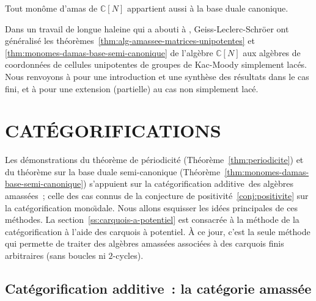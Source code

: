 \documentclass[brochure,12pt]{bourbaki}
\newcommand{\og}{\guillemotleft\hspace*{1pt}}
\newcommand{\fg}{\hspace*{1pt}\guillemotright}
\numberwithin{equation}{subsection}
\numberwithin{theorem}{section}
\newcommand{\C}{\mathbb{C}}
\begin{document}
\begin{conj}
  Tout mon\^ome d'amas de $\C[N]$ appartient aussi \`a la base duale
  canonique.
\end{conj}


Dans un travail de longue haleine qui a abouti \`a
\cite{GeissLeclercSchroeer07b}, Geiss-Leclerc-Schr\"oer ont
g\'en\'eralis\'e les
th\'eor\`emes~\ref{thm:alg-amassee-matrices-unipotentes} et
\ref{thm:monomes-damas-base-semi-canonique} de l'alg\`ebre $\C[N]$ aux
alg\`ebres de coordonn\'ees de cellules unipotentes de groupes de
Kac-Moody simplement lac\'es.  Nous renvoyons \`a
\cite{GeissLeclercSchroeer08a} pour une introduction et une synth\`ese
des r\'esultats dans le cas fini, et \`a \cite{Demonet09} pour une
extension (partielle) au cas non simplement lac\'e.


\section{CAT\'EGORIFICATIONS}
\label{s:categorifications}

Les d\'emonstrations du th\'eor\`eme de p\'eriodicit\'e
(Th\'eor\`eme~\ref{thm:periodicite}) et du th\'eor\`eme sur la base
duale semi-canonique
(Th\'eor\`eme~\ref{thm:monomes-damas-base-semi-canonique}) s'appuient
sur la \og cat\'egorification additive\fg\ des alg\`ebres amass\'ees~; celle
des cas connus de la conjecture de positivit\'e~\ref{conj:positivite}
sur la \og cat\'egorification mono\"{\i}dale\fg. Nous allons esquisser les
id\'ees principales de ces m\'ethodes. La
section~\ref{ss:carquois-a-potentiel} est consacr\'ee \`a la m\'ethode de
la cat\'egorification \`a l'aide des \og carquois \`a potentiel\fg. \`A ce
jour, c'est la seule m\'ethode qui permette de traiter des alg\`ebres
amass\'ees associ\'ees \`a des carquois finis arbitraires (sans
boucles ni $2$-cycles).

\subsection{Cat\'egorification additive~: la cat\'egorie amass\'ee}
\label{ss:categorification-additive-categorie-amassee}
\end{document}
